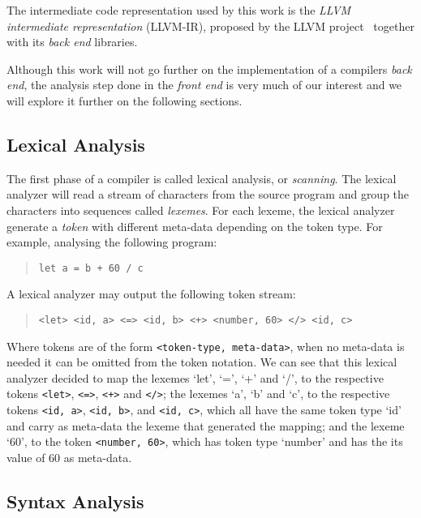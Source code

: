 \documentclass[
  english,
  lmodern,
  oneside
]{ufsc-thesis-rn46-2019/ufsc-thesis-rn46-2019}
\begin{document}
The intermediate code representation used by this work is the \textit{LLVM intermediate representation} (LLVM-IR), proposed by the LLVM project~\cite{lattner2004llvm} together with its \textit{back end} libraries.

Although this work will not go further on the implementation of a compilers \textit{back end}, the analysis step done in the \textit{front end} is very much of our interest and we will explore it further on the following sections.

\subsection{Lexical Analysis}

The first phase of a compiler is called lexical analysis, or \textit{scanning}.
The lexical analyzer will read a stream of characters from the source program and group the characters into sequences called \textit{lexemes}.
For each lexeme, the lexical analyzer generate a \textit{token} with different meta-data depending on the token type.
For example, analysing the following program:
\begin{quote}
\begin{verbatim}
let a = b + 60 / c
\end{verbatim}
\end{quote}
A lexical analyzer may output the following token stream:
\begin{quote}\label{figure:introduction_token_stream}
\begin{verbatim}
<let> <id, a> <=> <id, b> <+> <number, 60> </> <id, c>
\end{verbatim}
\end{quote}
Where tokens are of the form \verb+<token-type, meta-data>+, when no meta-data is needed it can be omitted from the token notation.
We can see that this lexical analyzer decided to map the lexemes `let', `=', `+' and `/', to the respective tokens \verb+<let>+, \verb+<=>+, \verb-<+>- and \verb+</>+;
the lexemes `a', `b' and `c', to the respective tokens \verb+<id, a>+, \verb+<id, b>+, and \verb+<id, c>+, which all have the same token type `id' and carry as meta-data the lexeme that generated the mapping; and the lexeme `60', to the token \verb+<number, 60>+, which has token type `number' and has the its value of $60$ as meta-data.
\subsection{Syntax Analysis}
\end{document}
